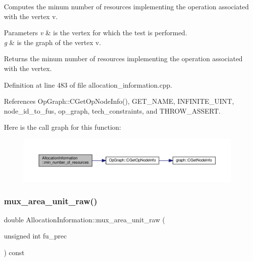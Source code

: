 Computes the minum number of resources implementing the operation associated with the vertex v. 


\begin{DoxyParams}{Parameters}
{\em v} & is the vertex for which the test is performed. \\
\hline
{\em g} & is the graph of the vertex v. \\
\hline
\end{DoxyParams}
\begin{DoxyReturn}{Returns}
the minum number of resources implementing the operation associated with the vertex. 
\end{DoxyReturn}


Definition at line 483 of file allocation\+\_\+information.\+cpp.



References Op\+Graph\+::\+C\+Get\+Op\+Node\+Info(), G\+E\+T\+\_\+\+N\+A\+ME, I\+N\+F\+I\+N\+I\+T\+E\+\_\+\+U\+I\+NT, node\+\_\+id\+\_\+to\+\_\+fus, op\+\_\+graph, tech\+\_\+constraints, and T\+H\+R\+O\+W\+\_\+\+A\+S\+S\+E\+RT.

Here is the call graph for this function\+:
\nopagebreak
\begin{figure}[H]
\begin{center}
\leavevmode
\includegraphics[width=350pt]{d7/d79/classAllocationInformation_a156ffef1d503c9b31d53d40a6a1501a8_cgraph}
\end{center}
\end{figure}
\mbox{\label{classAllocationInformation_a6a6237d060c2b4300ec143e945c61aff}} 
\subsubsection{\texorpdfstring{mux\+\_\+area\+\_\+unit\+\_\+raw()}{mux\_area\_unit\_raw()}}
{\footnotesize\ttfamily double Allocation\+Information\+::mux\+\_\+area\+\_\+unit\+\_\+raw (\begin{DoxyParamCaption}\item[{unsigned int}]{fu\+\_\+prec }\end{DoxyParamCaption}) const}



